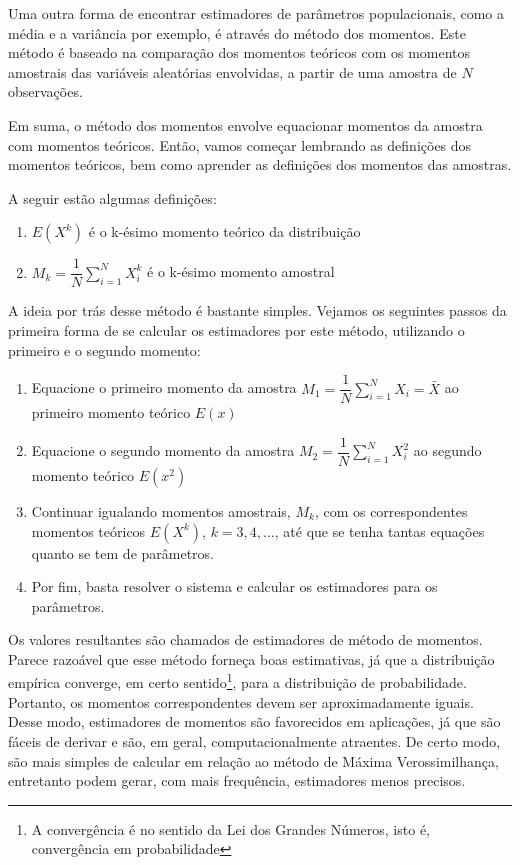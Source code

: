 Uma outra forma de encontrar estimadores de parâmetros populacionais, como a média e a variância por exemplo, é através do método dos momentos. Este método é baseado na comparação dos momentos teóricos com os momentos amostrais das variáveis aleatórias envolvidas, a partir de uma amostra de $N$ observações. 

Em suma, o método dos momentos envolve equacionar momentos da amostra com momentos teóricos. Então, vamos começar lembrando as definições dos momentos teóricos, bem como aprender as definições dos momentos das amostras.

A seguir estão algumas definições:
\begin{enumerate}
	\item $E(X^k)$ é o k-ésimo momento teórico da distribuição 
    \item $M_k=\dfrac{1}{N}\sum\limits_{i=1}^N X_i^k$ é o k-ésimo momento amostral 
\end{enumerate}

A ideia por trás desse método é bastante simples. Vejamos os seguintes passos da primeira forma de se calcular os estimadores por este método, utilizando o primeiro e o segundo momento:
\begin{enumerate}
  \item Equacione o primeiro momento da amostra  $M_1=\dfrac{1}{N}\sum\limits_{i=1}^N X_i=\bar{X}$ ao primeiro momento teórico $E(x)$
  \item Equacione o segundo momento da amostra $M_2=\dfrac{1}{N}\sum\limits_{i=1}^N X_i^2$ ao segundo momento teórico $E(x^2)$
  \item Continuar igualando momentos amostrais, $M_k$, com os correspondentes momentos teóricos  $E(X^k)$, $k = 3, 4, \dots $, até que se tenha tantas equações quanto se tem de parâmetros.
  \item Por fim, basta resolver o sistema e calcular os estimadores para os parâmetros.
\end{enumerate}

Os valores resultantes são chamados de estimadores de método de momentos. Parece razoável que esse método forneça boas estimativas, já que a distribuição empírica converge, em certo sentido\footnote{A convergência é no sentido da Lei dos Grandes Números, isto é, convergência em probabilidade}, para a distribuição de probabilidade. Portanto, os momentos correspondentes devem ser aproximadamente iguais. Desse modo, estimadores de momentos são favorecidos em aplicações, já que são fáceis de derivar e são, em geral, computacionalmente atraentes. De certo modo, são mais simples de calcular em relação ao método de Máxima Verossimilhança, entretanto podem gerar, com mais frequência, estimadores menos precisos. 

